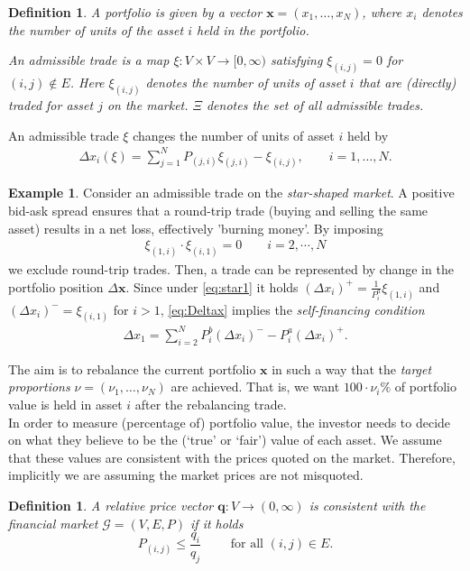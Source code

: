 \documentclass{article}
\newtheorem{definition}[theorem]{Definition}
\theoremstyle{definition}
\newtheorem{example}[theorem]{Example}
\def\bx{\mathbf{x}}
\def\bq{\mathbf{q}}
\begin{document}
\begin{definition}
A \emph{portfolio} is given by a vector $\bx = (x_1, \dots, x_N)$, where $x_i$ denotes the number of units of the asset $i$ held in the portfolio.

An \emph{admissible trade} is a map $\xi: V \times V \to [0, \infty)$ satisfying $\xi_{(i, j)} = 0$ for $(i,j) \not\in E$. Here $\xi_{(i, j)}$ denotes the number of units of asset $i$ that are (directly) traded for asset $j$ on the market. $\Xi$ denotes the set of all admissible trades.
\end{definition}
An admissible trade $\xi$ changes the number of units of asset $i$ held by
\begin{align}
\label{eq:Deltax}
\Delta x_i (\xi) = \sum_{j=1}^N P_{(j, i)} \xi_{(j, i)} - \xi_{(i,j)}, \quad \quad i = 1, \dots, N.    
\end{align}


\begin{example}\label{ex:star2}
Consider an admissible trade on the \emph{star-shaped market}. A positive bid-ask spread ensures that a round-trip trade (buying and selling the same asset) results in a net loss, effectively 'burning money'. By imposing 
\begin{align}
\label{eq:star1}
    \xi_{(1,i)} \cdot \xi_{(i,1)} = 0 \quad \quad  i = 2, \cdots, N
\end{align}
we exclude round-trip trades. Then, a trade can be represented by change in the portfolio position $\Delta \bx$. Since under \eqref{eq:star1} it holds $(\Delta x_i)^+ = \frac{1}{P^a_i} \xi_{(1,i)}$ and $(\Delta x_i)^- = \xi_{(i,1)}$ for $i > 1$, \eqref{eq:Deltax} implies the \emph{self-financing condition}
\begin{align*}
\Delta x_1  = \sum_{i=2}^N P^b_i (\Delta x_i)^- - P^a_i (\Delta x_i)^+.  
\end{align*}
\end{example}



The aim is to rebalance the current portfolio $\bx$ in such a way that the \emph{target proportions} $\nu = (\nu_1, \dots, \nu_N)$ are achieved. That is, we want $100 \cdot \nu_i \%$ of portfolio value is held in asset $i$ after the rebalancing trade.\\


In order to measure (percentage of) portfolio value, the investor needs to decide on what they believe to be the (`true' or `fair') value of each asset. We assume that these values are consistent with the prices quoted on the market. Therefore, implicitly we are assuming the market prices are not misquoted. 
\begin{definition}
A relative price vector $\bq: V \to (0, \infty)$ is \emph{consistent} with the financial market $\mathcal{G} = (V, E, P)$ if it holds
\[
P_{(i,j)} \leq \frac{q_i}{q_j} \quad \quad \text{ for all } (i, j) \in E.
\]
\end{definition}
\end{document}
